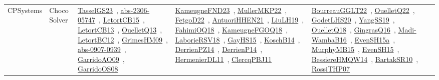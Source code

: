 {\begin{longtable}{lp{3cm}>{\raggedright\arraybackslash}p{6cm}>{\raggedright\arraybackslash}p{6cm}>{\raggedright\arraybackslash}p{8cm}}
CPSystems & Choco Solver & \href{works/TasselGS23.pdf}{TasselGS23}~\cite{TasselGS23}, \href{works/abs-2306-05747.pdf}{abs-2306-05747}~\cite{abs-2306-05747}, \href{works/LetortCB15.pdf}{LetortCB15}~\cite{LetortCB15}, \href{works/LetortCB13.pdf}{LetortCB13}~\cite{LetortCB13}, \href{works/OuelletQ13.pdf}{OuelletQ13}~\cite{OuelletQ13}, \href{works/LetortBC12.pdf}{LetortBC12}~\cite{LetortBC12}, \href{works/GrimesHM09.pdf}{GrimesHM09}~\cite{GrimesHM09}, \href{works/abs-0907-0939.pdf}{abs-0907-0939}~\cite{abs-0907-0939}, \href{works/GarridoAO09.pdf}{GarridoAO09}~\cite{GarridoAO09}, \href{works/GarridoOS08.pdf}{GarridoOS08}~\cite{GarridoOS08} & \href{works/KameugneFND23.pdf}{KameugneFND23}~\cite{KameugneFND23}, \href{works/MullerMKP22.pdf}{MullerMKP22}~\cite{MullerMKP22}, \href{works/FetgoD22.pdf}{FetgoD22}~\cite{FetgoD22}, \href{works/AntuoriHHEN21.pdf}{AntuoriHHEN21}~\cite{AntuoriHHEN21}, \href{works/LiuLH19.pdf}{LiuLH19}~\cite{LiuLH19}, \href{works/FahimiOQ18.pdf}{FahimiOQ18}~\cite{FahimiOQ18}, \href{works/KameugneFGOQ18.pdf}{KameugneFGOQ18}~\cite{KameugneFGOQ18}, \href{works/LaborieRSV18.pdf}{LaborieRSV18}~\cite{LaborieRSV18}, \href{works/GayHS15.pdf}{GayHS15}~\cite{GayHS15}, \href{works/KoschB14.pdf}{KoschB14}~\cite{KoschB14}, \href{works/DerrienPZ14.pdf}{DerrienPZ14}~\cite{DerrienPZ14}, \href{works/DerrienP14.pdf}{DerrienP14}~\cite{DerrienP14}, \href{works/HermenierDL11.pdf}{HermenierDL11}~\cite{HermenierDL11}, \href{works/ClercqPBJ11.pdf}{ClercqPBJ11}~\cite{ClercqPBJ11} & \href{works/BourreauGGLT22.pdf}{BourreauGGLT22}~\cite{BourreauGGLT22}, \href{works/OuelletQ22.pdf}{OuelletQ22}~\cite{OuelletQ22}, \href{works/GodetLHS20.pdf}{GodetLHS20}~\cite{GodetLHS20}, \href{works/YangSS19.pdf}{YangSS19}~\cite{YangSS19}, \href{works/OuelletQ18.pdf}{OuelletQ18}~\cite{OuelletQ18}, \href{works/GingrasQ16.pdf}{GingrasQ16}~\cite{GingrasQ16}, \href{works/Madi-WambaB16.pdf}{Madi-WambaB16}~\cite{Madi-WambaB16}, \href{works/EvenSH15a.pdf}{EvenSH15a}~\cite{EvenSH15a}, \href{works/MurphyMB15.pdf}{MurphyMB15}~\cite{MurphyMB15}, \href{works/EvenSH15.pdf}{EvenSH15}~\cite{EvenSH15}, \href{works/BessiereHMQW14.pdf}{BessiereHMQW14}~\cite{BessiereHMQW14}, \href{works/BartakSR10.pdf}{BartakSR10}~\cite{BartakSR10}, \href{works/RossiTHP07.pdf}{RossiTHP07}~\cite{RossiTHP07}\\

\end{longtable}}

